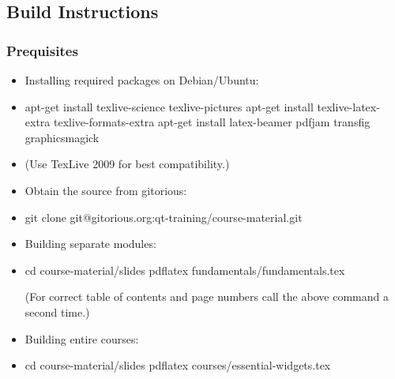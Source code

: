 %
%
%
%

\subsection{Build Instructions}

\begin{slide}[fragile]
  \frametitle{Prequisites}
  \begin{itemize}
    \item Installing required packages on Debian/Ubuntu:
    \item[] \begin{shell}
apt-get install texlive-science texlive-pictures
apt-get install texlive-latex-extra texlive-formats-extra
apt-get install latex-beamer pdfjam transfig graphicsmagick
    \end{shell}
    \item[] {\footnotesize (Use TexLive 2009 for best compatibility.)}
    \item Obtain the source from gitorious:
    \item[] \begin{shell}
git clone git@gitorious.org:qt-training/course-material.git
    \end{shell}
  \end{itemize}
\end{slide}

\begin{slide}[fragile]
  \begin{itemize}
    \item Building separate modules:
    \item[] \begin{shell}
cd course-material/slides
pdflatex fundamentals/fundamentals.tex
    \end{shell}
    {\footnotesize(For correct table of contents and page numbers call the above command a second time.)}
    \item Building entire courses:
    \item[] \begin{shell}
cd course-material/slides
pdflatex courses/essential-widgets.tex
    \end{shell}
  \end{itemize}
\end{slide}

